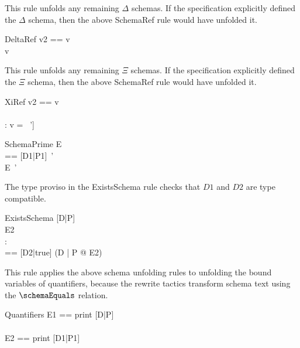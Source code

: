 \documentclass{article}
\begin{document}
This rule unfolds any remaining $\Delta$ schemas.
If the specification explicitly defined the $\Delta$ schema,
then the above SchemaRef rule would have unfolded it.
\begin{zedrule}{DeltaRef}
  \proviso v2 == \Delta \unprefix v \\
  [v2; v2~'] \sexprUnfoldsTo [D1|P1]
\derives
  v \sexprUnfoldsTo [D1|P1]
\end{zedrule}

This rule unfolds any remaining $\Xi$ schemas.
If the specification explicitly defined the $\Xi$ schema,
then the above SchemaRef rule would have unfolded it.
\begin{zedrule}{XiRef}
  \proviso v2 == \Xi \unprefix v \\
  [v2; v2~'] \sexprUnfoldsTo [D1|P1] \\
  \proviso [v2|true] : \power [D2]
\derives
  v \sexprUnfoldsTo [D1|P1 \land \theta [D2|true] = \theta [D2|true]~']
\end{zedrule}

\begin{zedrule}{SchemaPrime}
   E \sexprUnfoldsTo [D1 | P1] \\
   \proviso [D2|P2] == [D1|P1]~' \\
\derives
   E~' \sexprUnfoldsTo [D2 | P2]
\end{zedrule}

The type proviso in the ExistsSchema rule checks
that $D1$ and $D2$ are type compatible.
\begin{zedrule}{ExistsSchema}
   [D|P] \sexprUnfoldsTo [D1 | P1] \\
   E2 \sexprUnfoldsTo [D2 | P2] \\
   \proviso [D1 | true] \land [D2 | true] : \power [D3] \\
   \proviso [D4|true] == [D2|true] \schemaminus [D1|true]
\derives
   (\exists D | P @ E2) 
\end{zedrule}

This rule applies the above schema unfolding rules to unfolding
the bound variables of quantifiers, because the rewrite tactics
transform schema text using the $\schemaEquals$ relation.
\begin{zedrule}{Quantifiers}
   \proviso E1 == print [D|P] \\
   [D|P] \sexprUnfoldsTo [D1|P1] \\
   \proviso E2 == print [D1|P1]
\derives
   [D|P] \schemaEquals [D1|P1]
\end{zedrule}
\end{document}
